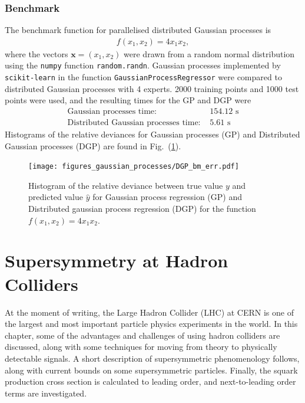 \documentclass[twoside,english]{uiofysmaster}
\begin{document}
\subsection{Benchmark}

The benchmark function for parallelised distributed Gaussian processes is
\begin{align*}
f(x_1, x_2) =  4x_1x_2,
\end{align*}
where the vectors $\textbf{x} = (x_1, x_2)$ were drawn from a random normal distribution using the \verb|numpy| function \verb|random.randn|. Gaussian processes implemented by \verb|scikit-learn| in the function \verb|GaussianProcessRegressor| were compared to distributed Gaussian processes with 4 experts. 2000 training points and 1000 test points were used, and the resulting times for the GP and DGP were
\begin{align}
\text{Gaussian processes time: }& 154.12 \text{ s}\\
\text{Distributed Gaussian processes time: }& 5.61 \text{ s}
\end{align}
Histograms of the relative deviances for Gaussian processes (GP) and Distributed Gaussian processes (DGP) are found in Fig.\ (\ref{Fig:: gaussian process : DGP BM error histogram}).

\begin{figure}
\centering
\texttt{[image: figures\_gaussian\_processes/DGP\_bm\_err.pdf]}
\caption{Histogram of the relative deviance between true value $y$ and predicted value $\hat{y}$ for Gaussian process regression (GP) and Distributed gaussian process regression (DGP) for the function $f(x_1,x_2) = 4x_1 x_2$.}
\label{Fig:: gaussian process : DGP BM error histogram}
\end{figure}



\chapter{Supersymmetry at Hadron Colliders}

At the moment of writing, the Large Hadron Collider (LHC) at CERN is one of the largest and most important particle physics experiments in the world. In this chapter, some of the advantages and challenges of using hadron colliders are discussed, along with some techniques for moving from theory to physically detectable signals. A short description of supersymmetric phenomenology follows, along with current bounds on some supersymmetric particles. Finally, the squark production cross section is calculated to leading order, and next-to-leading order terms are investigated.
\end{document}
